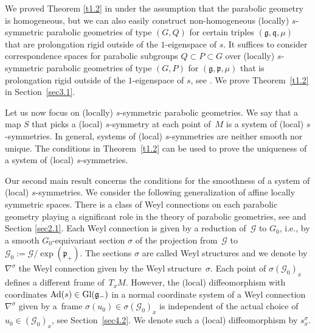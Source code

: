 \documentclass[10pt,a4paper]{amsart}
\newcommand{\si}{\sigma}
\newcommand{\ba}{\mathcal{G}}
\newcommand{\fg}{\mathfrak g}
\newcommand{\fp}{\mathfrak p}
\newcommand{\fq}{\mathfrak q}
\newcommand{\Ad}{{\rm Ad}}
\numberwithin{equation}{section}
\begin{document}
We proved Theorem \ref{t1.2} in \cite[Theorem 1.3]{GZ3} under the assumption that the parabolic geometry is homogeneous, but we can also easily construct non-homogeneous (locally) $s$-symmetric parabolic geometries of type $(G,Q)$ for certain triples $(\fg,\fq,\mu)$ that are prolongation rigid outside of the $1$-eigenspace of $s$. It suf\/f\/ices to consider correspondence spaces for parabolic subgroups $Q\subset P\subset G$ over (locally) $s$-symmetric parabolic geometries of type $(G,P)$ for $(\fg,\fp,\mu)$ that is prolongation rigid outside of the $1$-eigenspace of $s$, see \cite[Proposition 6.1]{GZ3}. We prove Theorem~\ref{t1.2} in Section~\ref{sec3.1}.

Let us now focus on (locally) $s$-symmetric parabolic geometries. We say that a map $S$ that picks a (local) $s$-symmetry at each point of~$M$ is a system of (local) $s$-symmetries. In general, systems of (local) $s$-symmetries are neither smooth nor unique. The conditions in Theorem~\ref{t1.2} can be used to prove the uniqueness of a system of (local) $s$-symmetries.

Our second main result concerns the conditions for the smoothness of a system of (local) $s$-symmetries. We consider the following generalization of af\/f\/ine locally symmetric spaces. There is a class of Weyl connections on each parabolic geometry playing a signif\/icant role in the theory of parabolic geometries, see \cite[Chapter 5]{parabook} and Section \ref{sec2.1}. Each Weyl connection is given by a reduction of~$\ba$ to $G_0$, i.e., by a smooth $G_0$-equivariant section $\si$ of the projection from~$\ba$ to~$\ba_0:=\ba/\exp(\fp_+)$. The sections $\si$ are called Weyl structures and we denote by $\nabla^\si$ the Weyl connection given by the Weyl structure~$\si$. Each point of $\si(\ba_0)_x$ def\/ines a dif\/ferent frame of~$T_xM$. However, the (local) dif\/feomorphism with coordinates $\Ad(s)\in {\rm Gl}(\fg_-)$ in a normal coordinate system of a Weyl connection~$\nabla^\si$ given by a~frame $\si(u_0)\in \si(\ba_0)_x$ is independent of the actual choice of $u_0\in (\ba_0)_x$, see Section~\ref{sec4.2}. We denote such a (local) dif\/feomorphism by $s_x^\si$.
\end{document}

